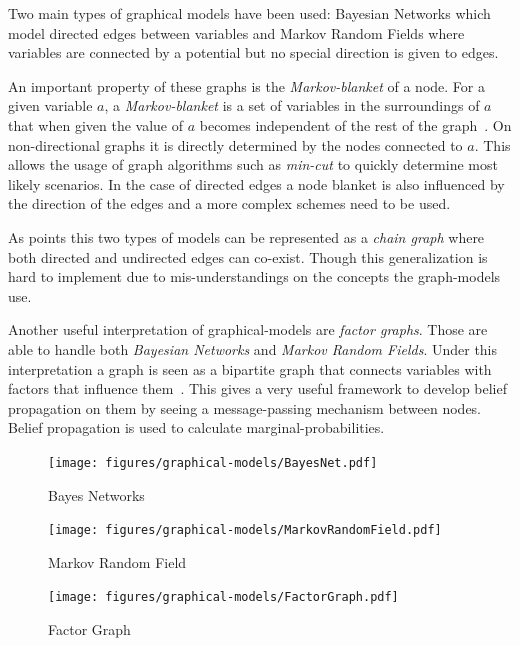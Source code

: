 Two main types of graphical models have been used: Bayesian Networks which model
directed edges between variables and Markov Random Fields where variables are
connected by a potential but no special direction is given to edges.

An important property of these graphs is the \emph{Markov-blanket} of a node.
For a given variable $a$, a \emph{Markov-blanket} is a set of variables in the
surroundings of $a$ that when given the value of $a$ becomes independent of the
rest of the graph~\citep{pearl1988probabilistic}.
On non-directional graphs it is directly determined by the nodes connected to $a$.
This allows the usage of graph algorithms such as \emph{min-cut} to quickly
determine most likely scenarios. In the case of directed edges a node blanket is
also influenced by the direction of the edges and a more complex schemes need to
be used.

As \cite{lauritzen2002chain} points this two types of models can be represented
as a \emph{chain graph} where both directed and undirected edges can co-exist.
Though this generalization is hard to implement due to mis-understandings on the
concepts the graph-models use.

Another useful interpretation of graphical-models are \emph{factor graphs}.
Those are able to handle both \emph{Bayesian Networks} and
\emph{Markov Random Fields}. Under this interpretation a graph is seen as a
bipartite graph that connects variables with factors that influence
them~\citep{bishop2006pattern}.
This gives a very useful framework to develop belief propagation on them by
seeing a message-passing mechanism between nodes. Belief propagation is used to
calculate marginal-probabilities.

\begin{figure}[ht]
    \begin{minipage}[b]{0.3\linewidth}
        \centering
        \texttt{[image: figures/graphical-models/BayesNet.pdf]}
        \caption{Bayes Networks}
    \end{minipage}
    \hspace{0.5cm}
    \begin{minipage}[b]{0.3\linewidth}
        \centering
        \texttt{[image: figures/graphical-models/MarkovRandomField.pdf]}
        \caption{Markov Random Field}
    \end{minipage}
    \hspace{0.5cm}
    \begin{minipage}[b]{0.3\linewidth}
        \centering
        \texttt{[image: figures/graphical-models/FactorGraph.pdf]}
        \caption{Factor Graph}
    \end{minipage}
\end{figure}

